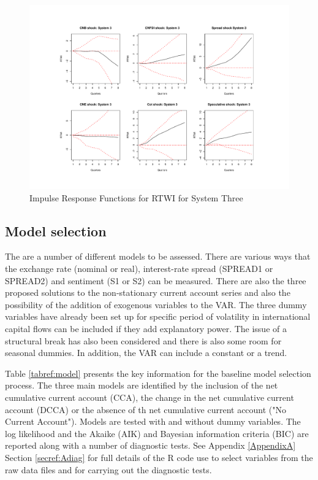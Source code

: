 \documentclass[12pt, a4paper, oneside]{article}\usepackage[]{graphicx}\usepackage[]{color}
\begin{document}
\begin{landscape}
\begin{figure}[t]
\graphicspath{{Pictures/C2/}}
\centering
\caption{Impulse Response Functions for RTWI for System Three}
\label{fig:IRF1}
\includegraphics[scale=0.8]{IRF3}
\end{figure}
\end{landscape} 



\subsection{Model selection}\label{secref:modelsel}
The are a number of different models to be assessed.  There are various ways that the exchange rate  (nominal or real), interest-rate spread (SPREAD1 or SPREAD2) and sentiment (S1 or S2) can be measured.  There are also the three proposed solutions to the non-stationary current account series and also the possibility of the addition of exogenous variables to the VAR.  The three dummy variables have already been set up for specific period of volatility in international capital flows can be included if they add explanatory power.   The issue of a structural break has also been considered and there is also some room for seasonal dummies.  In addition, the VAR can include a constant or a trend.  

Table \ref{tabref:model} presents the key information for the baseline model selection process.  The three main models are identified by the inclusion of the net cumulative current account (CCA), the change in the net cumulative current account (DCCA) or the absence of th net cumulative current account ("No Current Account").  Models are tested with and without dummy variables.  The log likelihood and the Akaike (AIK) and Bayesian information criteria (BIC) are reported along with a number of diagnostic tests.  See Appendix \ref{AppendixA} Section \ref{secref:Adiag} for full details of the R code use to select variables from the raw data files and for carrying out the diagnostic tests. 
\end{document}
